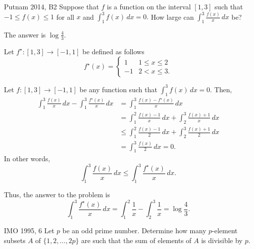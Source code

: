 
\begin{prob}{Putnam 2014, B2}{}
        Suppose that $f$ is a function on the interval $[1,3]$ such that $-1\le f(x)\le 1$ for all $x$ and $\displaystyle \int_1^3f(x)\,dx=0.$ How large can $\displaystyle\int_1^3\frac{f(x)}x\,dx$ be?
\end{prob}

\begin{sol}{}{}
	The answer is \(\boxed{\log\frac{4}{3}.}\)

	Let \(f^\star\colon [1, 3] \to [-1, 1]\) be defined as follows \[
		f^\star(x) =
		\begin{cases}
			1 & 1 \leq x \leq 2 \\
			-1 & 2 < x \leq 3.
		\end{cases}
	\]

	Let \(f\colon [1, 3] \to [-1, 1]\) be any function such that \(\displaystyle \int_1^3f(x)\,dx=0\). Then, 
	\begin{align*}
		\int_1^3\frac{f(x)}{x}\,dx - \int_1^3\frac{f^\star(x)}{x}\,dx 
		&= \int_1^3 \frac{f(x) - f^\star(x)}{x}\,dx \\
		&= \int_1^2 \frac{f(x) - 1}{x}\,dx + \int_2^3 \frac{f(x) + 1}{x}\,dx \\
		&\leq \int_1^2 \frac{f(x) - 1}{2}\,dx + \int_2^3 \frac{f(x) + 1}{2}\,dx \\
		&= \int_1^3 \frac{f(x)}{2}\,dx = 0.
	\end{align*}
	In other words, \[
		\int_1^3\frac{f(x)}{x}\,dx \leq \int_1^3\frac{f^\star(x)}{x}\,dx.
	\]

	Thus, the answer to the problem is \[
		\int_1^3\frac{f^\star(x)}{x}\,dx = \int_1^2 \frac{1}{x} - \int_2^3\frac{1}{x} = \log\frac{4}{3}.
	\]
\end{sol}

\begin{prob}{IMO 1995, 6}{}
	Let $p$ be an odd prime number. Determine how many $p$-element subsets $A$ of $ \{1,2,\dots,2p\}$ are such that the sum of elements of \(A\) is divisible by $p$.
\end{prob}

